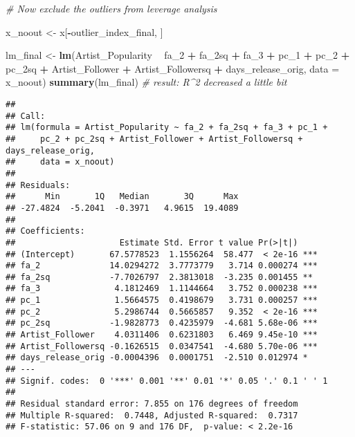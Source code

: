 \documentclass[
]{article}
\newenvironment{Shaded}{\begin{snugshade}}{\end{snugshade}}
\newcommand{\CommentTok}[1]{\textcolor[rgb]{0.56,0.35,0.01}{\textit{#1}}}
\newcommand{\DataTypeTok}[1]{\textcolor[rgb]{0.13,0.29,0.53}{#1}}
\newcommand{\DecValTok}[1]{\textcolor[rgb]{0.00,0.00,0.81}{#1}}
\newcommand{\KeywordTok}[1]{\textcolor[rgb]{0.13,0.29,0.53}{\textbf{#1}}}
\newcommand{\NormalTok}[1]{#1}
\newcommand{\OperatorTok}[1]{\textcolor[rgb]{0.81,0.36,0.00}{\textbf{#1}}}
\newcommand{\StringTok}[1]{\textcolor[rgb]{0.31,0.60,0.02}{#1}}
\begin{document}
\begin{Shaded}
\begin{Highlighting}[]
\CommentTok{# Now exclude the outliers from leverage analysis}

\NormalTok{x_noout <-}\StringTok{ }\NormalTok{x[}\OperatorTok{-}\NormalTok{outlier_index_final, ]}

\NormalTok{lm_final <-}\StringTok{ }\KeywordTok{lm}\NormalTok{(Artist_Popularity }\OperatorTok{~}\StringTok{ }\NormalTok{fa_}\DecValTok{2} \OperatorTok{+}\StringTok{ }\NormalTok{fa_2sq }\OperatorTok{+}\StringTok{ }\NormalTok{fa_}\DecValTok{3} \OperatorTok{+}\StringTok{ }\NormalTok{pc_}\DecValTok{1} \OperatorTok{+}\StringTok{ }\NormalTok{pc_}\DecValTok{2} \OperatorTok{+}\StringTok{ }\NormalTok{pc_2sq }\OperatorTok{+}\StringTok{ }\NormalTok{Artist_Follower }\OperatorTok{+}\StringTok{ }\NormalTok{Artist_Followersq }\OperatorTok{+}\StringTok{ }\NormalTok{days_release_orig, }\DataTypeTok{data =}\NormalTok{ x_noout)}
\KeywordTok{summary}\NormalTok{(lm_final) }\CommentTok{#  result: R^2 decreased a little bit}
\end{Highlighting}
\end{Shaded}

\begin{verbatim}
## 
## Call:
## lm(formula = Artist_Popularity ~ fa_2 + fa_2sq + fa_3 + pc_1 + 
##     pc_2 + pc_2sq + Artist_Follower + Artist_Followersq + days_release_orig, 
##     data = x_noout)
## 
## Residuals:
##      Min       1Q   Median       3Q      Max 
## -27.4824  -5.2041  -0.3971   4.9615  19.4089 
## 
## Coefficients:
##                     Estimate Std. Error t value Pr(>|t|)    
## (Intercept)       67.5778523  1.1556264  58.477  < 2e-16 ***
## fa_2              14.0294272  3.7773779   3.714 0.000274 ***
## fa_2sq            -7.7026797  2.3813018  -3.235 0.001455 ** 
## fa_3               4.1812469  1.1144664   3.752 0.000238 ***
## pc_1               1.5664575  0.4198679   3.731 0.000257 ***
## pc_2               5.2986744  0.5665857   9.352  < 2e-16 ***
## pc_2sq            -1.9828773  0.4235979  -4.681 5.68e-06 ***
## Artist_Follower    4.0311406  0.6231803   6.469 9.45e-10 ***
## Artist_Followersq -0.1626515  0.0347541  -4.680 5.70e-06 ***
## days_release_orig -0.0004396  0.0001751  -2.510 0.012974 *  
## ---
## Signif. codes:  0 '***' 0.001 '**' 0.01 '*' 0.05 '.' 0.1 ' ' 1
## 
## Residual standard error: 7.855 on 176 degrees of freedom
## Multiple R-squared:  0.7448, Adjusted R-squared:  0.7317 
## F-statistic: 57.06 on 9 and 176 DF,  p-value: < 2.2e-16
\end{verbatim}
\end{document}
